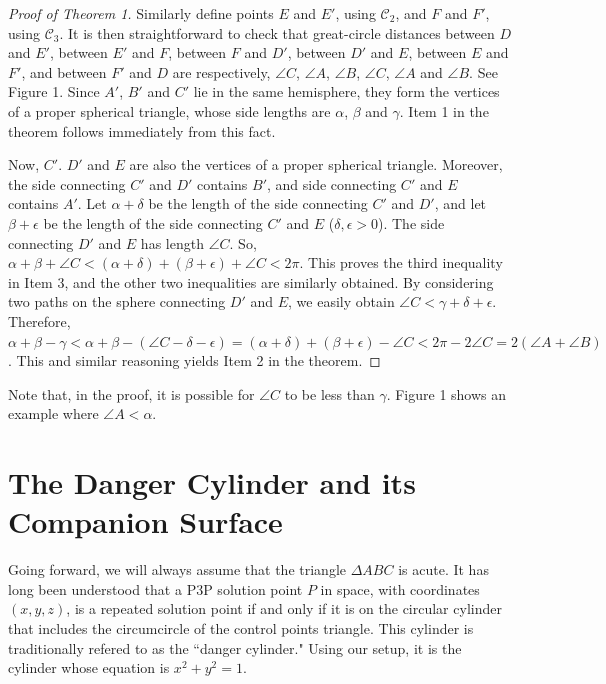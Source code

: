 \documentclass[a4paper, twoside]{article}
\begin{document}
\begin{proof}[Proof of Theorem 1]
Similarly define points $E$ and $E'$, using $\mathcal{C}_2$, and $F$ and $F'$, using $\mathcal{C}_3$. It is then straightforward to check that great-circle distances between $D$ and $E'$,  between $E'$ and $F$,  between $F$ and $D'$,  between $D'$ and $E$, between $E$ and $F'$, and between $F'$ and $D$ are respectively, $\angle C$, $\angle A$, $\angle B$, $\angle C$, $\angle A$ and $\angle B$. See Figure 1. Since $A'$, $B'$ and $C'$ lie in the same hemisphere, they form the vertices of a proper spherical triangle, whose side lengths are $\alpha$, $\beta$ and $\gamma$. Item 1 in the theorem follows immediately from this fact. 

Now, $C'$. $D'$ and $E$ are also the vertices of a proper spherical triangle. Moreover, the side connecting $C'$ and $D'$ contains $B'$, and side connecting $C'$ and $E$ contains $A'$. Let $\alpha + \delta$ be the length of the side connecting $C'$ and $D'$, and let $\beta + \epsilon$ be the length of the side connecting $C'$ and $E$ ($\delta, \epsilon > 0$). The side connecting $D'$ and $E$ has length $\angle C$. So, $\alpha + \beta + \angle C < (\alpha+\delta) + (\beta+\epsilon) + \angle C < 2 \pi$. This proves the third inequality in Item 3, and the other two inequalities are similarly obtained. By considering two paths on the sphere connecting $D'$ and $E$, we easily obtain $\angle C < \gamma + \delta + \epsilon$. Therefore, $\alpha + \beta - \gamma < \alpha + \beta - (\angle C - \delta - \epsilon) = (\alpha + \delta) + (\beta + \epsilon) - \angle C < 2\pi - 2 \angle C = 2 (\angle A + \angle B)$. This and similar reasoning yields Item 2 in the theorem. 

\end{proof} 

\noindent Note that, in the proof, it is possible for $\angle C$ to be less than $\gamma$. Figure 1 shows an example where $\angle A < \alpha$. 

\section{The Danger Cylinder and its Companion Surface} 

Going forward, we will always assume that the triangle $\Delta ABC$ is acute. It has long been understood that a P3P solution point $P$ in space, with coordinates $(x,y,z)$, is a repeated solution point if and only if it is on the circular cylinder that includes the circumcircle of the control points triangle. This cylinder is traditionally refered to as the ``danger cylinder." Using our setup, it is the cylinder whose equation is $x^2+y^2 = 1$. 
\end{document}

